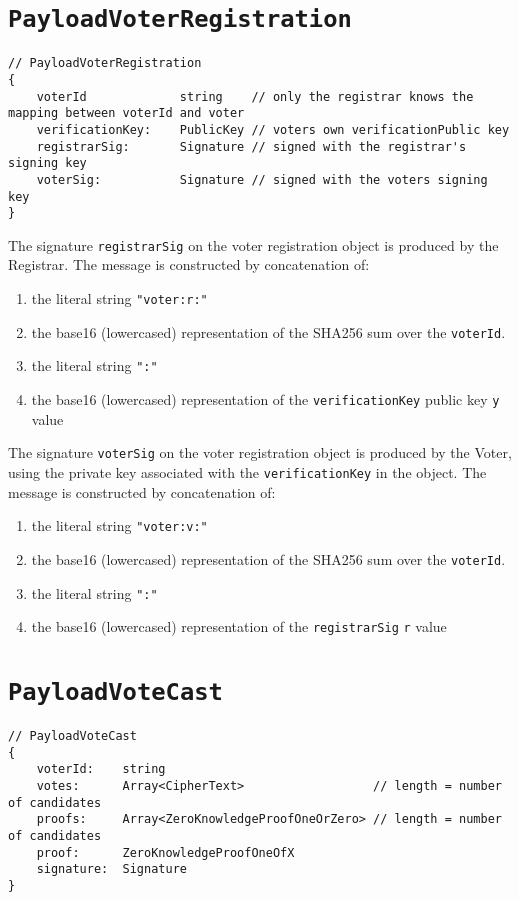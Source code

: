 \section*{\texttt{PayloadVoterRegistration}}
\label{dt:payload:reg}
\begin{lstlisting}[style=ES6]
// PayloadVoterRegistration
{
    voterId             string    // only the registrar knows the mapping between voterId and voter
    verificationKey:    PublicKey // voters own verificationPublic key
    registrarSig:       Signature // signed with the registrar's signing key
    voterSig:           Signature // signed with the voters signing key
}
\end{lstlisting}

The signature \texttt{registrarSig} on the voter registration object is produced by the Registrar. The message is constructed by concatenation of:

\begin{enumerate}
    \item the literal string \lstinline[style=ES6]{"voter:r:"}
    \item the base16 (lowercased) representation of the SHA256 sum over the \texttt{voterId}.
    \item the literal string \lstinline[style=ES6]{":"}
    \item the base16 (lowercased) representation of the \texttt{verificationKey} public key \texttt{y} value
\end{enumerate}

The signature \texttt{voterSig} on the voter registration object is produced by the Voter, using the private key associated with the \texttt{verificationKey} in the object. The message is constructed by concatenation of:

\begin{enumerate}
    \item the literal string \lstinline[style=ES6]{"voter:v:"}
    \item the base16 (lowercased) representation of the SHA256 sum over the \texttt{voterId}.
    \item the literal string \lstinline[style=ES6]{":"}
    \item the base16 (lowercased) representation of the \texttt{registrarSig} \texttt{r} value
\end{enumerate}

\section*{\texttt{PayloadVoteCast}}
\label{dt:payload:cast}
\begin{lstlisting}[style=ES6]
// PayloadVoteCast
{
    voterId:    string
    votes:      Array<CipherText>                  // length = number of candidates
    proofs:     Array<ZeroKnowledgeProofOneOrZero> // length = number of candidates
    proof:      ZeroKnowledgeProofOneOfX
    signature:  Signature
}
\end{lstlisting}

